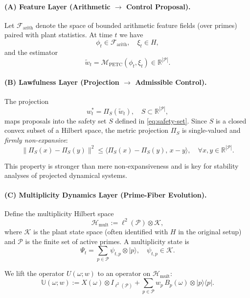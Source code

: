 \documentclass[11pt]{article}
\begin{document}
\paragraph{(A) Feature Layer (Arithmetic $\to$ Control Proposal).}

Let $\mathcal F_{\mathrm{arith}}$ denote the space of bounded arithmetic feature fields (over primes) paired with plant statistics. At time $t$ we have
\[
\phi_t \in \mathcal F_{\mathrm{arith}},\quad
\xi_t\in H,
\]
and the estimator
\[
\tilde w_t = \mathcal M_{\mathrm{PETC}}(\phi_t,\xi_t)\in\mathbb R^{|\mathcal P|}.
\]

\paragraph{(B) Lawfulness Layer (Projection $\to$ Admissible Control).}

The projection
\[
w_t^\ast = \Pi_S(\tilde w_t),\quad S\subset\mathbb R^{|\mathcal P|},
\]
maps proposals into the safety set $S$ defined in \eqref{eq:safety-set}. Since $S$ is a closed convex subset of a Hilbert space, the metric projection $\Pi_S$ is single-valued and \emph{firmly non-expansive}:
\begin{equation}
  \|\Pi_S(x) - \Pi_S(y)\|^2
  \le \langle \Pi_S(x)-\Pi_S(y),\, x-y\rangle,\quad \forall x,y\in\mathbb R^{|\mathcal P|}.
\end{equation}

This property is stronger than mere non-expansiveness and is key for stability analyses of projected dynamical systems.

\paragraph{(C) Multiplicity Dynamics Layer (Prime-Fiber Evolution).}

Define the multiplicity Hilbert space
\[
\mathcal H_{\mathrm{mult}}
:= \ell^2(\mathcal P)\otimes\mathcal K,
\]
where $\mathcal K$ is the plant state space (often identified with $H$ in the original setup) and $\mathcal P$ is the finite set of active primes. A multiplicity state is
\[
\Psi_t = \sum_{p\in\mathcal P} \psi_{t,p}\otimes |p\rangle,\quad \psi_{t,p}\in\mathcal K.
\]

We lift the operator $U(\omega;w)$ to an operator on $\mathcal H_{\mathrm{mult}}$:
\begin{equation}
  \mathbb U(\omega;w)
  := X(\omega)\otimes I_{\ell^2(\mathcal P)}
     + \sum_{p\in\mathcal P} w_p\, B_p(\omega)\otimes |p\rangle\langle p|.
  \label{eq:lifted-U}
\end{equation}
\end{document}

